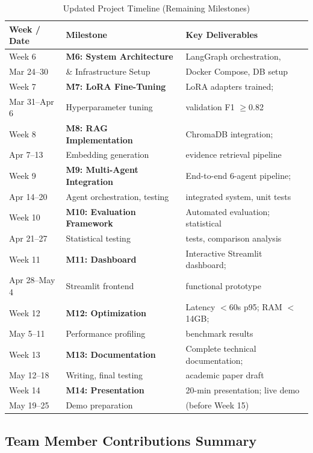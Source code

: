 \documentclass[journal]{IEEEtran}
\begin{document}
\begin{table}[htbp]
\centering
\caption{Updated Project Timeline (Remaining Milestones)}
\label{tab:updated_timeline}
\begin{tabular}{>{\raggedright\arraybackslash}p{2.5cm}|p{5cm}|p{5cm}}
\toprule
\textbf{Week / Date} & \textbf{Milestone} & \textbf{Key Deliverables} \\
\midrule
Week 6 & \textbf{M6: System Architecture} & LangGraph orchestration, \\
Mar 24--30 & \& Infrastructure Setup & Docker Compose, DB setup \\
\midrule
Week 7 & \textbf{M7: LoRA Fine-Tuning} & LoRA adapters trained; \\
Mar 31--Apr 6 & Hyperparameter tuning & validation F1 $\geq$0.82 \\
\midrule
Week 8 & \textbf{M8: RAG Implementation} & ChromaDB integration; \\
Apr 7--13 & Embedding generation & evidence retrieval pipeline \\
\midrule
Week 9 & \textbf{M9: Multi-Agent Integration} & End-to-end 6-agent pipeline; \\
Apr 14--20 & Agent orchestration, testing & integrated system, unit tests \\
\midrule
Week 10 & \textbf{M10: Evaluation Framework} & Automated evaluation; statistical \\
Apr 21--27 & Statistical testing & tests, comparison analysis \\
\midrule
Week 11 & \textbf{M11: Dashboard} & Interactive Streamlit dashboard; \\
Apr 28--May 4 & Streamlit frontend & functional prototype \\
\midrule
Week 12 & \textbf{M12: Optimization} & Latency $<$60s p95; RAM $<$14GB; \\
May 5--11 & Performance profiling & benchmark results \\
\midrule
Week 13 & \textbf{M13: Documentation} & Complete technical documentation; \\
May 12--18 & Writing, final testing & academic paper draft \\
\midrule
Week 14 & \textbf{M14: Presentation} & 20-min presentation; live demo \\
May 19--25 & Demo preparation & (before Week 15) \\
\bottomrule
\end{tabular}
\end{table}

\subsection{Team Member Contributions Summary}
\end{document}
